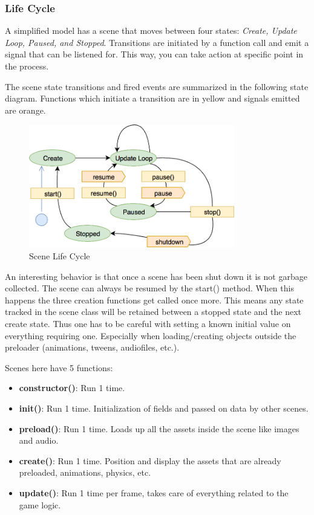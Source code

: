 \subsubsection{Life Cycle}
A simplified model has a scene that moves between four states: \textit{Create, Update Loop, Paused, and Stopped}.
Transitions are initiated by a function call and emit a signal that can be listened for.
This way, you can take action at specific point in the process.

The scene state transitions and fired events are summarized in the following state diagram.
Functions which initiate a transition are in yellow and signals emitted are orange\cite{phaser-guides-scenes}.

\begin{figure}[H]
    \centering
    \includegraphics[width=0.8\textwidth]{figures/lifecycle}
    \caption{Scene Life Cycle\cite{phaser-guides-scenes}}
    \label{fig:lifecycle}
\end{figure}

An interesting behavior is that once a scene has been shut down it is not garbage collected.
The scene can always be resumed by the start() method.
When this happens the three creation functions get called once more.
This means any state tracked in the scene class will be retained between a stopped state and the next create state.
Thus one has to be careful with setting a known initial value on everything requiring one.
Especially when loading/creating objects outside the preloader (animations, tweens, audiofiles, etc.)\cite{phaser-guides-scenes}.

Scenes here have 5 functions:

\begin{itemize}
    \item \textbf{constructor()}: Run 1 time.
    \item \textbf{init()}: Run 1 time. Initialization of fields and passed on data by other scenes.
    \item \textbf{preload()}: Run 1 time. Loads up all the assets inside the scene like images and audio.
    \item \textbf{create()}: Run 1 time. Position and display the assets that are already preloaded, animations, physics, etc.
    \item \textbf{update()}: Run 1 time per frame, takes care of everything related to the game logic.
\end{itemize}


